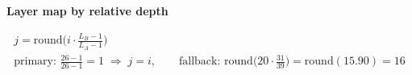 \documentclass[border=40pt]{standalone}
\begin{document}
\begin{minipage}{26cm}
{\sffamily\bfseries\Large\color{muted} Layer map by relative depth}\par\vspace{-14pt}
{\LARGE
\begin{gather*}
j = \mathrm{round}\Big(i\cdot\frac{L_B-1}{L_A-1}\Big)
\\[6pt]
\text{primary: } \frac{26-1}{26-1} = 1 \;\Rightarrow\; j = i, \qquad
\text{fallback: } \mathrm{round}\Big(20\cdot\frac{31}{39}\Big) = \mathrm{round}(15.90) = 16
\end{gather*}}
\end{minipage}
\end{document}
